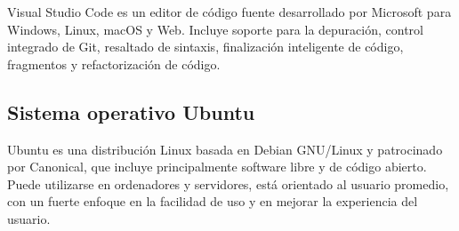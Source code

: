 Visual Studio Code es un editor de código fuente desarrollado por Microsoft para Windows, Linux, macOS y Web. Incluye soporte para la depuración, control integrado de Git, resaltado de sintaxis, finalización inteligente de código, fragmentos y refactorización de código. 


\subsection{Sistema operativo Ubuntu}
Ubuntu es una distribución Linux basada en Debian GNU/Linux y patrocinado por Canonical, que incluye principalmente software libre y de código abierto. Puede utilizarse en ordenadores y servidores, está orientado al usuario promedio, con un fuerte enfoque en la facilidad de uso y en mejorar la experiencia del usuario. 


